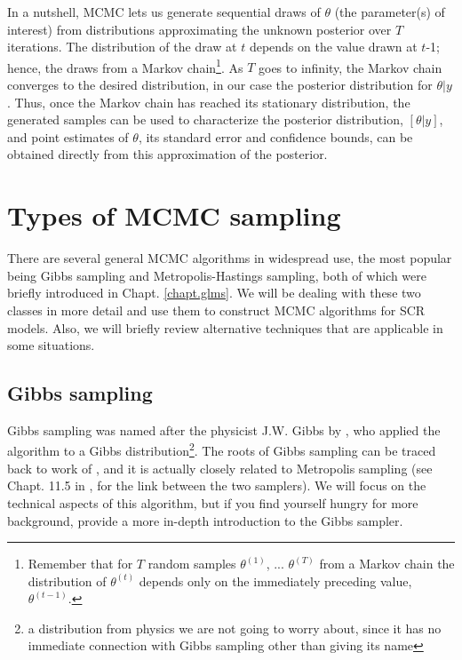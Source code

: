 In a nutshell, MCMC lets us generate sequential draws of $\theta$ (the
parameter(s) of interest) from distributions approximating the unknown
posterior over $T$ iterations. The distribution of the draw at $t$ depends
on the value drawn at $t$-1; hence, the draws from a Markov
chain\footnote{Remember that for
  $T$ random samples $\theta^ {(1)}$, ... $\theta^{(T)}$ from a Markov chain
  the distribution of $\theta^{(t)}$ depends only on the immediately preceding
  value, $\theta^{(t-1)}$.}. As $T$ goes to infinity, the Markov chain
converges to the desired distribution, in our case the posterior
distribution for $\theta|y$. Thus, once the Markov chain has reached
its stationary distribution, the generated samples can be used to
characterize the posterior distribution, $[\theta|y]$, and point
estimates of $\theta$, its standard error and confidence bounds, can
be obtained directly from this approximation of the posterior.



\section{Types of MCMC sampling}

There are several general MCMC algorithms in widespread use, the most popular being Gibbs
sampling and Metropolis-Hastings sampling, both of which were briefly
introduced in Chapt. \ref{chapt.glms}. We will be dealing with these
two classes in more detail and use them to construct MCMC
algorithms for SCR models. Also, we will briefly review alternative
techniques that are applicable in some situations.


\subsection{Gibbs sampling}
\label{mcmc.sec.gibbs}

Gibbs sampling was named after the physicist J.W. Gibbs by
\citet{geman_geman:1984}, who applied the algorithm to a Gibbs
distribution\footnote{a distribution from physics we are not going to
  worry about, since it has no immediate connection with Gibbs
  sampling other than giving its name}. The roots of Gibbs sampling
can be traced back to work of \citet{metropolis_ulam:1953}, and it is
actually closely related to Metropolis sampling (see Chapt. 11.5 in
\citet{gelman_etal:2004}, for the link between the two samplers). We
will focus on the technical aspects of this algorithm, but if you find
yourself hungry for more background, \citet{casella_george:1992}
provide a more in-depth introduction to the Gibbs sampler.

